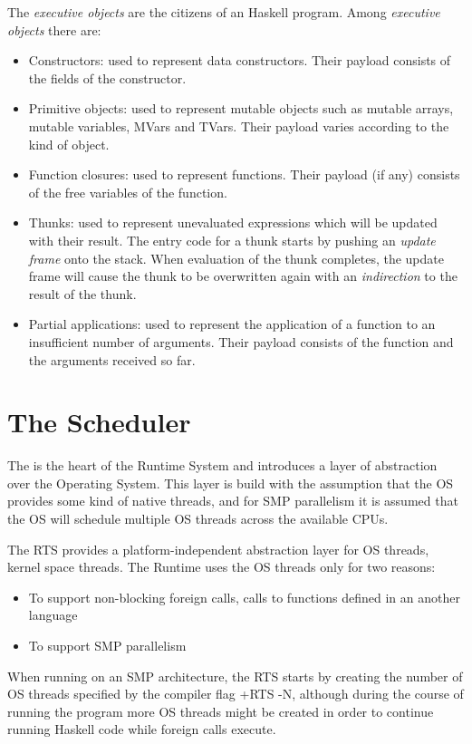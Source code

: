 The \emph{executive objects} are the citizens of an Haskell program. Among \emph{executive objects} there are:
\begin{itemize}
\item Constructors: used to represent data constructors. Their payload consists of the fields of the constructor.
\item Primitive objects: used to represent mutable objects such as mutable arrays, mutable variables, MVars and TVars. Their payload varies according to the kind of object.
\item Function closures: used to represent functions. Their payload (if any) consists of the free variables of the function.
\item Thunks: used to represent unevaluated expressions which will be updated with their result. The entry code for a thunk starts by pushing an \emph{update frame} onto the stack. When evaluation of the thunk completes, the update frame will cause the thunk to be overwritten again with an \emph{indirection} to the result of the thunk.
\item Partial applications: used to represent the application of a function to an insufficient number of arguments. Their payload consists of the function and the arguments received so far.
\end{itemize}

\section{The Scheduler}
The   is the heart of the Runtime System and introduces a layer of abstraction over the Operating System.
This layer is build with the assumption that the OS provides some kind of native threads, and for SMP parallelism it is assumed that the OS will schedule multiple OS threads across the available CPUs.

The RTS provides a platform-independent abstraction layer for OS threads, \ie kernel space threads. The Runtime uses the OS threads only for two reasons:
\begin{itemize}
\item To support non-blocking foreign calls, \ie calls to functions defined in an another language
\item To support SMP parallelism
\end{itemize}

When running on an SMP architecture, the RTS starts by creating the number of OS threads specified by the compiler flag +RTS -N, although during the course of running the program more OS threads might be created in order to continue running Haskell code while foreign calls execute.

